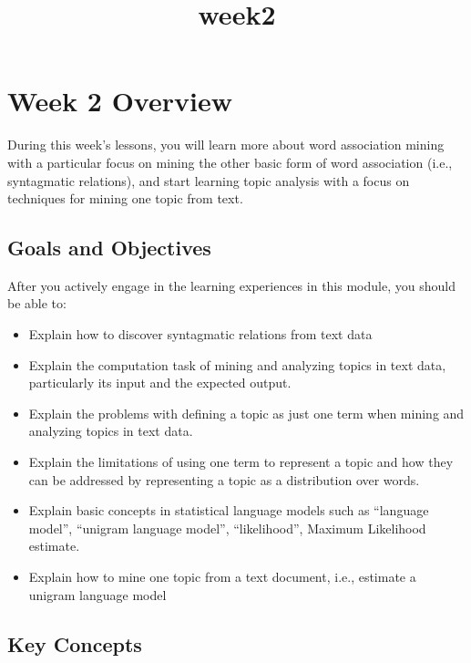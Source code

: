 \documentclass[11pt]{article}
\title{week2}
\providecommand{\tightlist}{%
      \setlength{\itemsep}{0pt}\setlength{\parskip}{0pt}}
\begin{document}
    
    
    \maketitle
    
    

    
    \section{Week 2 Overview}\label{week-2-overview}

During this week's lessons, you will learn more about word association
mining with a particular focus on mining the other basic form of word
association (i.e., syntagmatic relations), and start learning topic
analysis with a focus on techniques for mining one topic from text.

    \subsection{Goals and Objectives}\label{goals-and-objectives}

After you actively engage in the learning experiences in this module,
you should be able to:

\begin{itemize}
\tightlist
\item
  Explain how to discover syntagmatic relations from text data
\item
  Explain the computation task of mining and analyzing topics in text
  data, particularly its input and the expected output.
\item
  Explain the problems with defining a topic as just one term when
  mining and analyzing topics in text data.
\item
  Explain the limitations of using one term to represent a topic and how
  they can be addressed by representing a topic as a distribution over
  words.
\item
  Explain basic concepts in statistical language models such as
  ``language model'', ``unigram language model'', ``likelihood'',
  Maximum Likelihood estimate.
\item
  Explain how to mine one topic from a text document, i.e., estimate a
  unigram language model
\end{itemize}

    \subsection{Key Concepts}\label{key-concepts}
\end{document}
